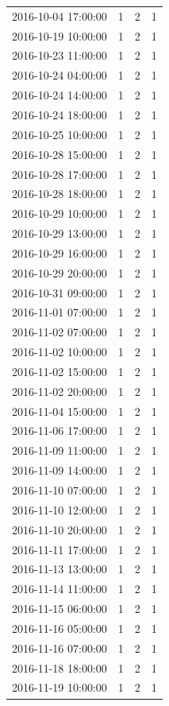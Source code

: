 \begin{tabular}{lrrr}
2016-10-04 17:00:00 & 1 & 2 & 1 \\
2016-10-19 10:00:00 & 1 & 2 & 1 \\
2016-10-23 11:00:00 & 1 & 2 & 1 \\
2016-10-24 04:00:00 & 1 & 2 & 1 \\
2016-10-24 14:00:00 & 1 & 2 & 1 \\
2016-10-24 18:00:00 & 1 & 2 & 1 \\
2016-10-25 10:00:00 & 1 & 2 & 1 \\
2016-10-28 15:00:00 & 1 & 2 & 1 \\
2016-10-28 17:00:00 & 1 & 2 & 1 \\
2016-10-28 18:00:00 & 1 & 2 & 1 \\
2016-10-29 10:00:00 & 1 & 2 & 1 \\
2016-10-29 13:00:00 & 1 & 2 & 1 \\
2016-10-29 16:00:00 & 1 & 2 & 1 \\
2016-10-29 20:00:00 & 1 & 2 & 1 \\
2016-10-31 09:00:00 & 1 & 2 & 1 \\
2016-11-01 07:00:00 & 1 & 2 & 1 \\
2016-11-02 07:00:00 & 1 & 2 & 1 \\
2016-11-02 10:00:00 & 1 & 2 & 1 \\
2016-11-02 15:00:00 & 1 & 2 & 1 \\
2016-11-02 20:00:00 & 1 & 2 & 1 \\
2016-11-04 15:00:00 & 1 & 2 & 1 \\
2016-11-06 17:00:00 & 1 & 2 & 1 \\
2016-11-09 11:00:00 & 1 & 2 & 1 \\
2016-11-09 14:00:00 & 1 & 2 & 1 \\
2016-11-10 07:00:00 & 1 & 2 & 1 \\
2016-11-10 12:00:00 & 1 & 2 & 1 \\
2016-11-10 20:00:00 & 1 & 2 & 1 \\
2016-11-11 17:00:00 & 1 & 2 & 1 \\
2016-11-13 13:00:00 & 1 & 2 & 1 \\
2016-11-14 11:00:00 & 1 & 2 & 1 \\
2016-11-15 06:00:00 & 1 & 2 & 1 \\
2016-11-16 05:00:00 & 1 & 2 & 1 \\
2016-11-16 07:00:00 & 1 & 2 & 1 \\
2016-11-18 18:00:00 & 1 & 2 & 1 \\
2016-11-19 10:00:00 & 1 & 2 & 1 \\

\end{tabular}
